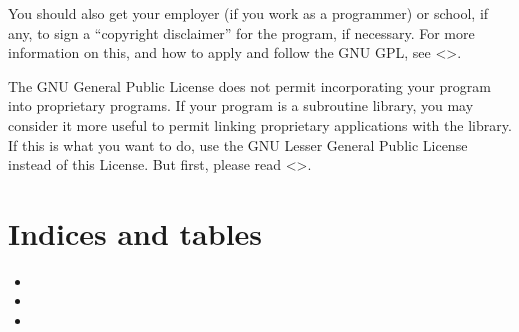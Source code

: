 \documentclass[letterpaper,10pt,english]{sphinxmanual}
\begin{document}
\sphinxAtStartPar
You should also get your employer (if you work as a programmer) or school, if any, to sign a “copyright disclaimer” for the program, if necessary. For more information on this, and how to apply and follow the GNU GPL, see \textless{}\textgreater{}.

\sphinxAtStartPar
The GNU General Public License does not permit incorporating your program into proprietary programs. If your program is a subroutine library, you may consider it more useful to permit linking proprietary applications with the library. If this is what you want to do, use the GNU Lesser General Public License instead of this License. But first, please read \textless{}\textgreater{}.


\chapter{Indices and tables}
\label{\detokenize{index:indices-and-tables}}\begin{itemize}
\item {} 
\sphinxAtStartPar
{}

\item {} 
\sphinxAtStartPar
{}

\item {} 
\sphinxAtStartPar
{}

\end{itemize}



\renewcommand{\indexname}{Index}
\printindex
\end{document}
